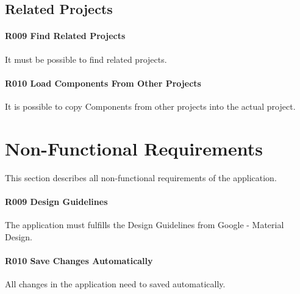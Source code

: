 \subsection{Related Projects}
\paragraph{R009 Find Related Projects}
It must be possible to find related projects.
\paragraph{R010 Load Components From Other Projects}
It is possible to copy Components from other projects into the actual project.



\section{Non-Functional Requirements}
This section describes all non-functional requirements of the application.
\paragraph{R009 Design Guidelines}
The application must fulfills the Design Guidelines from Google - Material Design.
\paragraph{R010 Save Changes Automatically}
All changes in the application need to saved automatically.